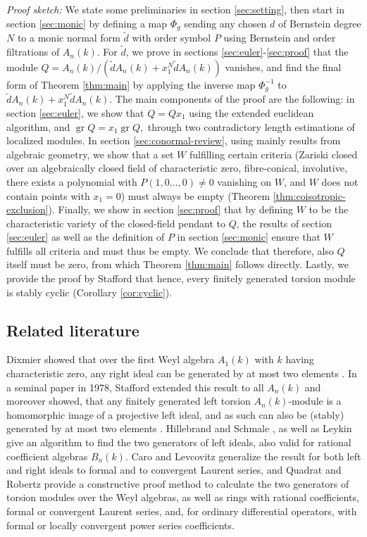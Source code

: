 \documentclass[pdflatex,sn-mathphys-num]{sn-jnl}
\numberwithin{equation}{section}
\theoremstyle{thmstyleone}
\theoremstyle{thmstyletwo}
\newcommand{\gr}{\operatorname{gr}}
\begin{document}
\textit{Proof sketch:}
We state some preliminaries in section \ref{sec:setting}, then start in section \ref{sec:monic} by defining a map $\Phi_g$ sending any chosen $d$ of Bernstein degree $N$ to a monic normal form $\tilde d$ with order symbol $P$ using Bernstein and order filtrations of $A_n(k)$. For $\tilde d$, we prove in sections \ref{sec:euler}-\ref{sec:proof} that the module $Q = A_n(k)/(\tilde d A_n(k) + x_1^N\tilde d A_n(k)) $ vanishes, and find the final form of Theorem \ref{thm:main} by applying the inverse map $\Phi_g^{-1}$ to $\tilde d A_n(k) + x_1^N\tilde d A_n(k).$ The main components of the proof are the following: in section \ref{sec:euler}, we show that $Q = Qx_1$ using the extended euclidean algorithm, and $\gr Q = x_1\gr Q,$ through two contradictory length estimations of localized modules. In section \ref{sec:conormal-review}, using mainly results from algebraic geometry, we show that a set $W$ fulfilling certain criteria (Zariski closed over an algebraically closed field of characteristic zero, fibre-conical, involutive, there exists a polynomial with $P(1,0\dots,0)\neq 0$ vanishing on $W$, and $W$ does not contain points with $x_1 = 0$) must always be empty (Theorem \ref{thm:coisotropic-exclusion}). Finally, we show in section \ref{sec:proof} that by defining $W$ to be the characteristic variety of the closed-field pendant to $Q$, the results of section \ref{sec:euler} as well as the definition of $P$ in section \ref{sec:monic} ensure that $W$ fulfills all criteria and must thus be empty. We conclude that therefore, also $Q$ itself must be zero, from which Theorem \ref{thm:main} follows directly. Lastly, we provide the proof by Stafford \cite{Stafford1978} that hence, every finitely generated torsion module is stably cyclic (Corollary \ref{cor:cyclic}). 


\subsection{Related literature}
Dixmier showed that over the first Weyl algebra $A_1(k)$ with $k$ having characteristic zero, any right ideal can be generated by at most two elements \cite{dixmier}. In a seminal paper in 1978, Stafford extended this result to all $A_n(k)$ and moreover showed, that any finitely generated left torsion $A_n(k)$-module is a homomorphic image of a projective left ideal, and as such can also be (stably) generated by at most two elements \cite[Theorem 3.7]{Stafford1978}.
Hillebrand and Schmale \cite{HillebrandSchmale2001}, as well as Leykin \cite{Leykin2004} give an algorithm to find the two generators of left ideals, also valid for rational coefficient algebras $B_n(k)$. Caro and Levcovitz \cite{CaroLevcovitz2010} generalize the result for both left and right ideals to formal and to convergent Laurent series, and Quadrat and Robertz \cite{QuadratRobertz2014} provide a constructive proof method to calculate the two generators of torsion modules over the Weyl algebras, as well as rings with rational coefficients, formal or convergent Laurent series, and, for ordinary differential operators, with formal or locally convergent power series coefficients. 
\end{document}
